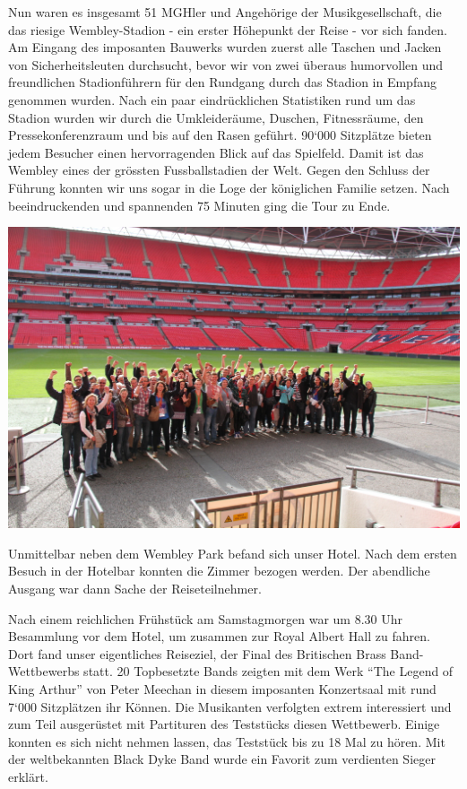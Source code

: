 \begin{history}
    Nun waren es insgesamt 51 MGHler und Angehörige der Musikgesellschaft, die
    das riesige Wembley-Stadion - ein erster Höhepunkt der Reise - vor sich
    fanden. Am Eingang des imposanten Bauwerks wurden zuerst alle Taschen und
    Jacken von Sicherheitsleuten durchsucht, bevor wir von zwei überaus
    humorvollen und freundlichen Stadionführern für den Rundgang durch das
    Stadion in Empfang genommen wurden. Nach ein paar eindrücklichen Statistiken
    rund um das Stadion wurden wir durch die Umkleideräume, Duschen,
    Fitnessräume, den Pressekonferenzraum und bis auf den Rasen geführt. 90`000
    Sitzplätze bieten jedem Besucher einen hervorragenden Blick auf das
    Spielfeld. Damit ist das Wembley eines der grössten Fussballstadien der
    Welt. Gegen den Schluss der Führung konnten wir uns sogar in die Loge der
    königlichen Familie setzen. Nach beeindruckenden und spannenden 75 Minuten
    ging die Tour zu Ende.

    \begin{MulticolFigure}
        \centering
        \includegraphics[width=0.93\linewidth]{./chap/2001-2024/2014/Wembley-Gruppe.jpg}
    \end{MulticolFigure}

    Unmittelbar neben dem Wembley Park befand sich unser Hotel. Nach dem ersten
    Besuch in der Hotelbar konnten die Zimmer bezogen werden. Der abendliche
    Ausgang war dann Sache der Reiseteilnehmer.

    Nach einem reichlichen Frühstück am Samstagmorgen war um 8.30 Uhr Besammlung
    vor dem Hotel, um zusammen zur Royal Albert Hall zu fahren. Dort fand unser
    eigentliches Reiseziel, der Final des Britischen Brass Band-Wettbewerbs
    statt. 20 Topbesetzte Bands zeigten mit dem Werk \enquote{The Legend of King
        Arthur} von Peter Meechan in diesem imposanten Konzertsaal mit rund 7‘000
    Sitzplätzen ihr Können. Die Musikanten verfolgten extrem interessiert und
    zum Teil ausgerüstet mit Partituren des Teststücks diesen Wettbewerb. Einige
    konnten es sich nicht nehmen lassen, das Teststück bis zu 18 Mal zu hören.
    Mit der weltbekannten Black Dyke Band wurde ein Favorit zum verdienten
    Sieger erklärt.


\end{history}
